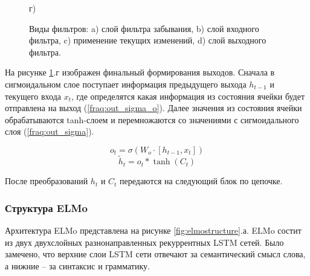 \documentclass[a4paper,14pt]{article}
\begin{document}
\begin{figure}[H]
\begin{minipage}[h]{0.4\linewidth}
	\end{minipage}
	\hfill
	\begin{minipage}[h]{0.4\linewidth}
		 г) \\
	\end{minipage}
	\caption{Виды фильтров: 
		 a) слой фильтра забывания,
		 b) слой входного фильтра,
		 c) применение текущих изменений,
		 d) слой выходного фильтра.}
	\label{fig:LSTM_layers}
\end{figure}

На рисунке \ref{fig:LSTM_layers}.г изображен финальный формирования выходов.
Сначала в сигмоидальном слое поступает информация предыдущего выхода $h_{t−1}$ и текущего входа $x_t$, где определятся какая информация из состояния ячейки будет отправлена на выход (\ref{fraq:out_sigma_o}).
Далее значения из состояния ячейки обрабатываются tanh-слоем и перемножаются со значениями с сигмоидального слоя (\ref*{fraq:out_sigma}).

\begin{equation}
	o_t = \sigma(W_o\cdot[h_{t-1},x_t]) 
	\label{fraq:out_sigma_o}
\end{equation}
\begin{equation}
	\tilde h_t = o_t * \tanh(C_t)
	\label{fraq:out_sigma}
\end{equation}

После преобразований $h_t$ и $C_t$ передаются на следующий блок по цепочке.	

\subsubsection{Структура ELMo}

Архитектура ELMo представлена на рисунке \ref{fig:elmostructure}.а.
ELMo состит из двух двухслойных разнонаправленных рекуррентных LSTM сетей.
Было замечено, что верхние слои LSTM сети отвечают за семантический смысл слова, а нижние -- за синтаксис и грамматику.
\end{document}
